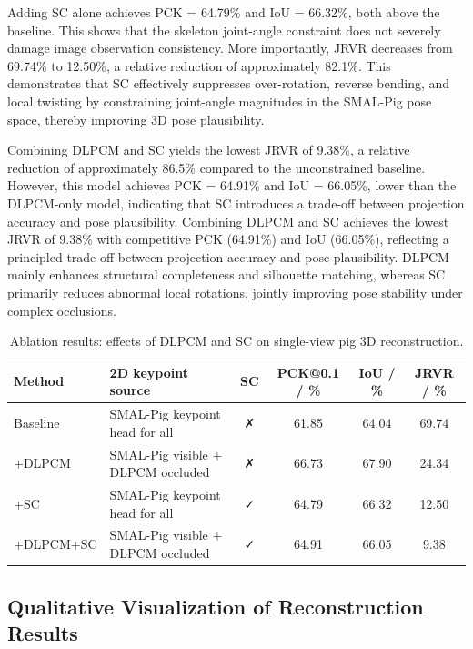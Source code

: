 \documentclass[computers,article,submit,pdftex,moreauthors]{mdpi}
\begin{document}
Adding SC alone achieves PCK = 64.79\% and IoU = 66.32\%, both above the baseline. This shows that the skeleton joint-angle constraint does not severely damage image observation consistency. More importantly, JRVR decreases from 69.74\% to 12.50\%, a relative reduction of approximately 82.1\%. This demonstrates that SC effectively suppresses over-rotation, reverse bending, and local twisting by constraining joint-angle magnitudes in the SMAL-Pig pose space, thereby improving 3D pose plausibility.

Combining DLPCM and SC yields the lowest JRVR of 9.38\%, a relative reduction of approximately 86.5\% compared to the unconstrained baseline. However, this model achieves PCK = 64.91\% and IoU = 66.05\%, lower than the DLPCM-only model, indicating that SC introduces a trade-off between projection accuracy and pose plausibility. Combining DLPCM and SC achieves the lowest JRVR of 9.38\% with competitive PCK (64.91\%) and IoU (66.05\%), reflecting a principled trade-off between projection accuracy and pose plausibility. DLPCM mainly enhances structural completeness and silhouette matching, whereas SC primarily reduces abnormal local rotations, jointly improving pose stability under complex occlusions.

\begin{table}[H]
\caption{Ablation results: effects of DLPCM and SC on single-view pig 3D reconstruction.}
\label{tab:ablation}
\centering
\begin{tabular}{llcccc}
\toprule
\textbf{Method} & \textbf{2D keypoint source} & \textbf{SC} & \textbf{PCK@0.1 / \%} & \textbf{IoU / \%} & \textbf{JRVR / \%} \\
\midrule
Baseline & SMAL-Pig keypoint head for all & ✗ & 61.85 & 64.04 & 69.74 \\
+DLPCM & SMAL-Pig visible + DLPCM occluded & ✗ & 66.73 & 67.90 & 24.34 \\
+SC & SMAL-Pig keypoint head for all & ✓ & 64.79 & 66.32 & 12.50 \\
+DLPCM+SC & SMAL-Pig visible + DLPCM occluded & ✓ & 64.91 & 66.05 & 9.38 \\
\bottomrule
\end{tabular}
\end{table}

\subsection{Qualitative Visualization of Reconstruction Results}\label{sec:qualitative}
\end{document}
